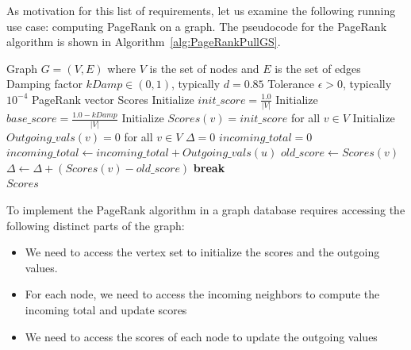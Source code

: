 As motivation for this list of requirements, let us examine the following running use case: computing PageRank on a graph.
The pseudocode for the PageRank algorithm is shown in Algorithm~\autoref{alg:PageRankPullGS}.

\begin{algorithm}
  \begin{algorithmic}[1]
  \Require Graph $G = (V,E)$ where $V$ is the set of nodes and $E$ is the set of edges
  \Require Damping factor $kDamp \in (0, 1)$, typically $d = 0.85$
  \Require Tolerance $\epsilon > 0$, typically $10^{-4}$
  \Ensure PageRank vector Scores
  \State Initialize $init\_score = \frac{1.0}{|V|}$
  \State Initialize $base\_score = \frac{1.0 - kDamp}{|V|}$
  \State Initialize $Scores(v) = init\_score$ for all $v \in V$
  \State Initialize $Outgoing\_vals(v) = 0$ for all $v \in V$
      \State {}
  \EndFor
      \State $\Delta = 0$
          \State $incoming\_total = 0$
              \State $incoming\_total \gets incoming\_total + Outgoing\_vals(u)$
          \EndFor
          \State $old\_score \gets Scores(v)$
          \State {}
          \State $\Delta \gets \Delta + (Scores(v) - old\_score)$
          \State {}
      \EndFor
      \If{$\Delta < \epsilon$}
          \State \textbf{break}
      \EndIf
  \EndFor \\
  \Return $Scores$
  \end{algorithmic}
  \caption{PageRank Algorithm as specified in GAP Benchmark. The highlighted lines indicate different accesses: , , and .}
  \label{alg:PageRankPullGS}
  \end{algorithm}


To implement the PageRank algorithm in a graph database requires accessing the following distinct parts of the graph:
\begin{itemize}
\item We need to access the vertex set to initialize the scores and the outgoing values.
\item For each node, we need to access the incoming neighbors to compute the incoming total and update scores
\item We need to access the scores of each node to update the outgoing values
\end{itemize}





